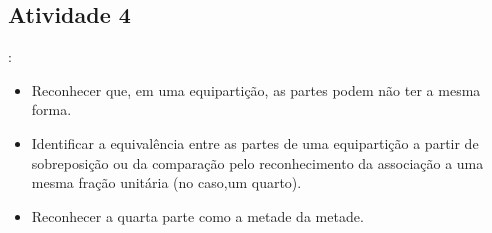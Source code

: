 \begin{multicols}{2}
\subsection{Atividade 4}
  \vspace{.1cm}:
\begin{itemize} %
    \item       Reconhecer que, em uma equipartição, as partes podem não ter a mesma forma.
    \item       Identificar a equivalência entre as partes de uma equipartição a partir de sobreposição ou da comparação pelo reconhecimento da associação a uma mesma fração unitária (no caso,um quarto).
    \item       Reconhecer a quarta parte como a metade da metade.
\end{itemize} %
 \vspace{.1cm}

   \vspace{.1cm}


\end{multicols}
